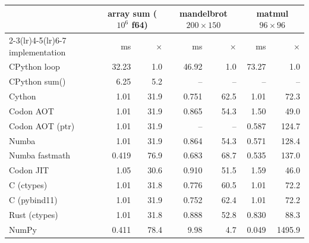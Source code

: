 \begin{tabular}{lrrrrrr}
\toprule
& \multicolumn{2}{c}{array sum ($10^6$ f64)} & \multicolumn{2}{c}{mandelbrot $200{\times}150$} & \multicolumn{2}{c}{matmul $96{\times}96$} \\
\cmidrule(lr){2-3}\cmidrule(lr){4-5}\cmidrule(lr){6-7}
implementation & ms & $\times$ & ms & $\times$ & ms & $\times$ \\
\midrule
CPython loop & 32.23 & 1.0 & 46.92 & 1.0 & 73.27 & 1.0 \\
CPython sum() & 6.25 & 5.2 & -- & -- & -- & -- \\
Cython & 1.01 & 31.9 & 0.751 & 62.5 & 1.01 & 72.3 \\
Codon AOT & 1.01 & 31.9 & 0.865 & 54.3 & 1.50 & 49.0 \\
Codon AOT (ptr) & 1.01 & 31.9 & -- & -- & 0.587 & 124.7 \\
Numba & 1.01 & 31.9 & 0.864 & 54.3 & 0.571 & 128.4 \\
Numba fastmath & 0.419 & 76.9 & 0.683 & 68.7 & 0.535 & 137.0 \\
Codon JIT & 1.05 & 30.6 & 0.910 & 51.5 & 1.59 & 46.0 \\
C (ctypes) & 1.01 & 31.8 & 0.776 & 60.5 & 1.01 & 72.2 \\
C (pybind11) & 1.01 & 31.9 & 0.752 & 62.4 & 1.01 & 72.2 \\
Rust (ctypes) & 1.01 & 31.8 & 0.888 & 52.8 & 0.830 & 88.3 \\
NumPy & 0.411 & 78.4 & 9.98 & 4.7 & 0.049 & 1495.9 \\
\bottomrule
\end{tabular}
